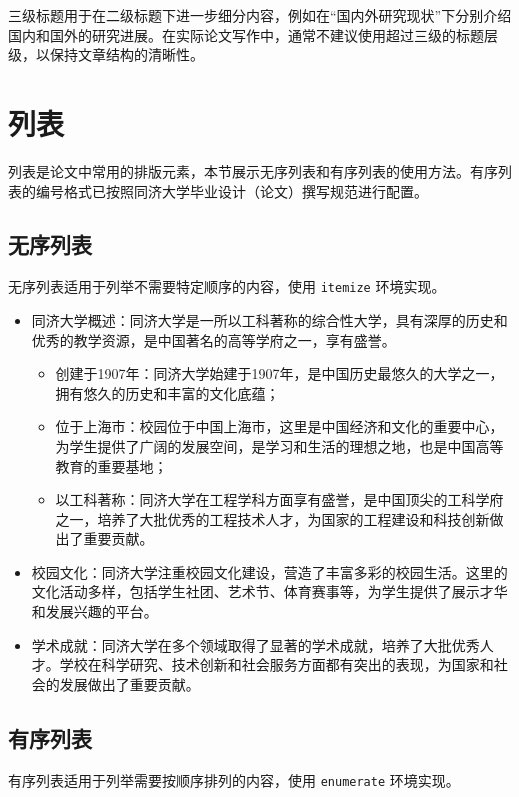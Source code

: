 三级标题用于在二级标题下进一步细分内容，例如在“国内外研究现状”下分别介绍国内和国外的研究进展。在实际论文写作中，通常不建议使用超过三级的标题层级，以保持文章结构的清晰性。

\section{列表}

列表是论文中常用的排版元素，本节展示无序列表和有序列表的使用方法。有序列表的编号格式已按照同济大学毕业设计（论文）撰写规范进行配置。

\subsection{无序列表}

无序列表适用于列举不需要特定顺序的内容，使用 \texttt{itemize} 环境实现。

\begin{itemize}
    \item 同济大学概述：同济大学是一所以工科著称的综合性大学，具有深厚的历史和优秀的教学资源，是中国著名的高等学府之一，享有盛誉。
    \begin{itemize}
        \item 创建于1907年：同济大学始建于1907年，是中国历史最悠久的大学之一，拥有悠久的历史和丰富的文化底蕴；
        \item 位于上海市：校园位于中国上海市，这里是中国经济和文化的重要中心，为学生提供了广阔的发展空间，是学习和生活的理想之地，也是中国高等教育的重要基地；
        \item 以工科著称：同济大学在工程学科方面享有盛誉，是中国顶尖的工科学府之一，培养了大批优秀的工程技术人才，为国家的工程建设和科技创新做出了重要贡献。
    \end{itemize}
    \item 校园文化：同济大学注重校园文化建设，营造了丰富多彩的校园生活。这里的文化活动多样，包括学生社团、艺术节、体育赛事等，为学生提供了展示才华和发展兴趣的平台。
    \item 学术成就：同济大学在多个领域取得了显著的学术成就，培养了大批优秀人才。学校在科学研究、技术创新和社会服务方面都有突出的表现，为国家和社会的发展做出了重要贡献。
\end{itemize}

\subsection{有序列表}

有序列表适用于列举需要按顺序排列的内容，使用 \texttt{enumerate} 环境实现。

